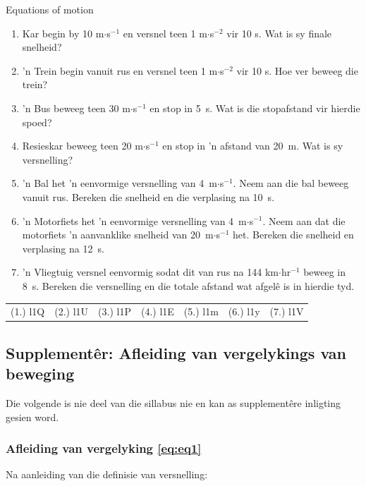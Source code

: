 \noindent
\begin{exercises}{Equations of motion}
\nopagebreak \noindent
\begin{enumerate}[noitemsep, label=\textbf{\arabic*}. ] 
    \item \n Kar begin by 10 m$\ensuremath{\cdot}$s${}^{-1}$ en versnel teen 1 m$\ensuremath{\cdot}$s${}^{-2}$ vir 10 s. Wat is sy finale snelheid?
    \item  'n Trein begin vanuit rus en versnel teen 1 m$\ensuremath{\cdot}$s${}^{-2}$ vir 10 s. Hoe ver beweeg die trein?
\item  'n Bus beweeg teen 30 m$\ensuremath{\cdot}$s${}^{-1}$ en stop in 5~s. Wat is die stopafstand vir hierdie spoed?
\item \n Resieskar beweeg teen 20 m$\ensuremath{\cdot}$s${}^{-1}$ en stop in  'n afstand van 20~m. Wat is sy versnelling? 
\item  'n Bal het  'n eenvormige versnelling van 4~m$\ensuremath{\cdot}$s${}^{-1}$. Neem aan die bal beweeg vanuit rus. Bereken die snelheid en die verplasing na 10~s.
\item  'n Motorfiets het  'n eenvormige versnelling van 4~m$\ensuremath{\cdot}$s${}^{-1}$. Neem aan dat die motorfiets  'n aanvanklike snelheid van 20~m$\ensuremath{\cdot}$s${}^{-1}$ het. Bereken die snelheid en verplasing na 12~s.\newline
\item  'n Vliegtuig versnel eenvormig sodat dit van rus na 144 km$\ensuremath{\cdot}$hr${}^{-1}$ beweeg in 8~s. Bereken die versnelling en die totale afstand wat afgel\^e is in hierdie tyd.
\end{enumerate}
    \label{m38796*cid11}
\practiceinfo
 \par \begin{tabular}[h]{cccccc}
 (1.) l1Q  &  (2.) l1U  &  (3.) l1P  &  (4.) l1E  &  (5.) l1m  &  (6.) l1y  & (7.) l1V \end{tabular}
\end{exercises}

\subsection*{Supplement\^er: Afleiding van vergelykings van beweging}
\nopagebreak
Die volgende is nie deel van die sillabus nie en kan as supplement\^ere inligting gesien word.\par
            
\subsubsection*{Afleiding van vergelyking \ref{eq:eq1}}
\nopagebreak
Na aanleiding van die definisie van versnelling:\par 
\label{m38796*id76246}\nopagebreak\noindent{}
            
